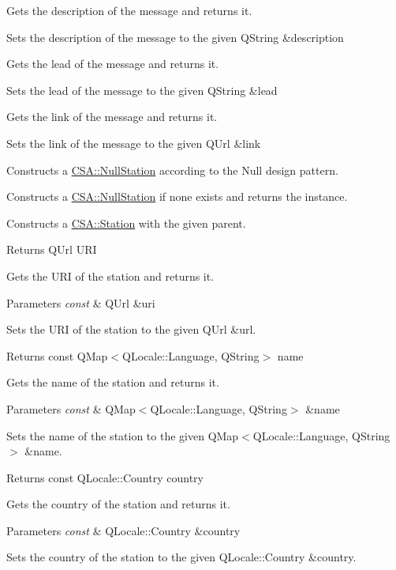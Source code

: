 Gets the description of the message and returns it.

Sets the description of the message to the given Q\+String \&description

Gets the lead of the message and returns it.

Sets the lead of the message to the given Q\+String \&lead

Gets the link of the message and returns it.

Sets the link of the message to the given Q\+Url \&link

Constructs a \mbox{\hyperlink{classCSA_1_1NullStation}{C\+S\+A\+::\+Null\+Station}} according to the Null design pattern.

Constructs a \mbox{\hyperlink{classCSA_1_1NullStation}{C\+S\+A\+::\+Null\+Station}} if none exists and returns the instance.

Constructs a \mbox{\hyperlink{classCSA_1_1Station}{C\+S\+A\+::\+Station}} with the given parent.

\begin{DoxyReturn}{Returns}
Q\+Url U\+RI
\end{DoxyReturn}
Gets the U\+RI of the station and returns it.


\begin{DoxyParams}{Parameters}
{\em const} & Q\+Url \&uri\\
\hline
\end{DoxyParams}
Sets the U\+RI of the station to the given Q\+Url \&url.

\begin{DoxyReturn}{Returns}
const Q\+Map$<$\+Q\+Locale\+::\+Language, Q\+String$>$ name
\end{DoxyReturn}
Gets the name of the station and returns it.


\begin{DoxyParams}{Parameters}
{\em const} & Q\+Map$<$\+Q\+Locale\+::\+Language, Q\+String$>$ \&name\\
\hline
\end{DoxyParams}
Sets the name of the station to the given Q\+Map$<$\+Q\+Locale\+::\+Language, Q\+String$>$ \&name.

\begin{DoxyReturn}{Returns}
const Q\+Locale\+::\+Country country
\end{DoxyReturn}
Gets the country of the station and returns it.


\begin{DoxyParams}{Parameters}
{\em const} & Q\+Locale\+::\+Country \&country\\
\hline
\end{DoxyParams}
Sets the country of the station to the given Q\+Locale\+::\+Country \&country.

